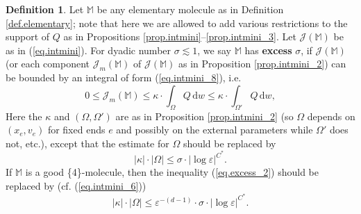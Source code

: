 \documentclass[10pt, reqno]{amsart}
\newcommand{\Mb}{\mathbb M}
\newcommand {\Jc}{\mathcal J}
\theoremstyle{definition}
\newtheorem{definition}[theorem]{Definition}
\theoremstyle{remark}
\numberwithin{equation}{section}
\begin{document}
\begin{definition}\label{def.excess} Let $\Mb$ be any elementary molecule as in Definition \ref{def.elementary}; note that here we are allowed to add various restrictions to the support of $Q$ as in Propositions \ref{prop.intmini}--\ref{prop.intmini_3}. Let $\Jc(\Mb)$ be as in (\ref{eq.intmini}). For dyadic number $\sigma\lesssim 1$, we say $\Mb$ has \textbf{excess} $\sigma$, if $\Jc(\Mb)$ (or each component $\Jc_m(\Mb)$ of $\Jc(\Mb)$ as in Proposition \ref{prop.intmini_2}) can be bounded by an integral of form (\ref{eq.intmini_8}), i.e. 
\begin{equation}\label{eq.excess_1}0\leq\Jc_m(\Mb)\leq\kappa\cdot\int_\Omega Q\,\mathrm{d}w\leq\kappa\cdot\int_{\Omega'}Q\,\mathrm{d}w,\end{equation} Here the $\kappa$ and $(\Omega,\Omega')$ are as in Proposition \ref{prop.intmini_2} (so $\Omega$ depends on $(x_e,v_e)$ for fixed ends $e$ and possibly on the external parameters while $\Omega'$ does not, etc.), except that the estimate for $\Omega$ should be replaced by \begin{equation}\label{eq.excess_2}|\kappa|\cdot|\Omega|\leq \sigma\cdot|\log\varepsilon|^{C^*}.\end{equation} If $\Mb$ is a good \{4\}-molecule, then the inequality (\ref{eq.excess_2}) should be replaced by (cf. (\ref{eq.intmini_6})) \begin{equation}\label{eq.excess_3}|\kappa|\cdot|\Omega|\leq \varepsilon^{-(d-1)}\cdot\sigma\cdot|\log\varepsilon|^{C^*}.\end{equation}
\end{definition}
\end{document}
